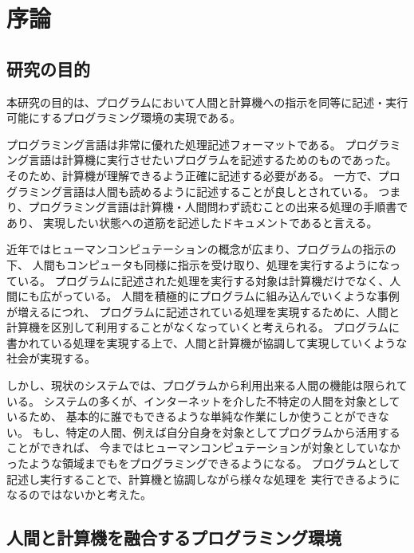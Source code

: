\chapter{序論}\label{chap:introduction}

\section{研究の目的}\label{ux7814ux7a76ux306eux76eeux7684}

本研究の目的は、プログラムにおいて人間と計算機への指示を同等に記述・実行可能にするプログラミング環境の実現である。

プログラミング言語は非常に優れた処理記述フォーマットである。
プログラミング言語は計算機に実行させたいプログラムを記述するためのものであった。
そのため、計算機が理解できるよう正確に記述する必要がある。
一方で、プログラミング言語は人間も読めるように記述することが良しとされている。
つまり、プログラミング言語は計算機・人間問わず読むことの出来る処理の手順書であり、
実現したい状態への道筋を記述したドキュメントであると言える。

近年ではヒューマンコンピュテーションの概念が広まり、プログラムの指示の下、
人間もコンピュータも同様に指示を受け取り、処理を実行するようになっている。
プログラムに記述された処理を実行する対象は計算機だけでなく、人間にも広がっている。
人間を積極的にプログラムに組み込んでいくような事例が増えるにつれ、
プログラムに記述されている処理を実現するために、人間と計算機を区別して利用することがなくなっていくと考えられる。
プログラムに書かれている処理を実現する上で、人間と計算機が協調して実現していくような
社会が実現する。

しかし、現状のシステムでは、プログラムから利用出来る人間の機能は限られている。
システムの多くが、インターネットを介した不特定の人間を対象としているため、
基本的に誰でもできるような単純な作業にしか使うことができない。
もし、特定の人間、例えば自分自身を対象としてプログラムから活用することができれば、
今まではヒューマンコンピュテーションが対象としていなかったような領域までもをプログラミングできるようになる。
プログラムとして記述し実行することで、計算機と協調しながら様々な処理を
実行できるようになるのではないかと考えた。

\section{人間と計算機を融合するプログラミング環境}\label{ux4ebaux9593ux3068ux8a08ux7b97ux6a5fux3092ux878dux5408ux3059ux308bux30d7ux30edux30b0ux30e9ux30dfux30f3ux30b0ux74b0ux5883}

